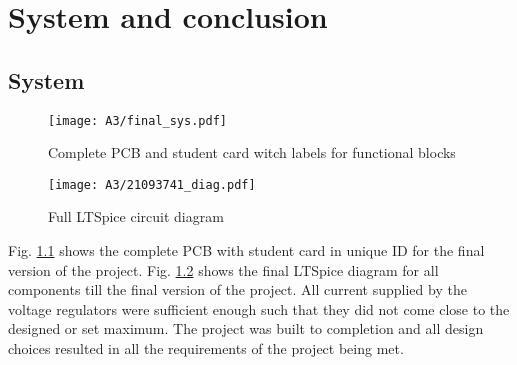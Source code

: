 \chapter{System and conclusion}
\vspace{-1cm}
\section{System}


\begin{figure}[H]
    \centering
    \texttt{[image: A3/final\_sys.pdf]}
    \caption{Complete PCB and student card witch labels for functional blocks} 
    \label{fig:PCB}
\end{figure}

\begin{figure}[H]
    \centering
    \texttt{[image: A3/21093741\_diag.pdf]}
    \caption{Full LTSpice circuit diagram}
    \label{fig:21093741}
\end{figure}


Fig. \ref{fig:PCB} shows the complete PCB with student card in unique ID for the final version of the project. Fig. \ref{fig:21093741} shows the final LTSpice diagram for all components till the final version of the project. All current supplied by the voltage regulators were sufficient enough such that they did not come close to the designed or set maximum. The project was built to completion and all design choices resulted in all the requirements of the project \cite{project_overview} being met.

